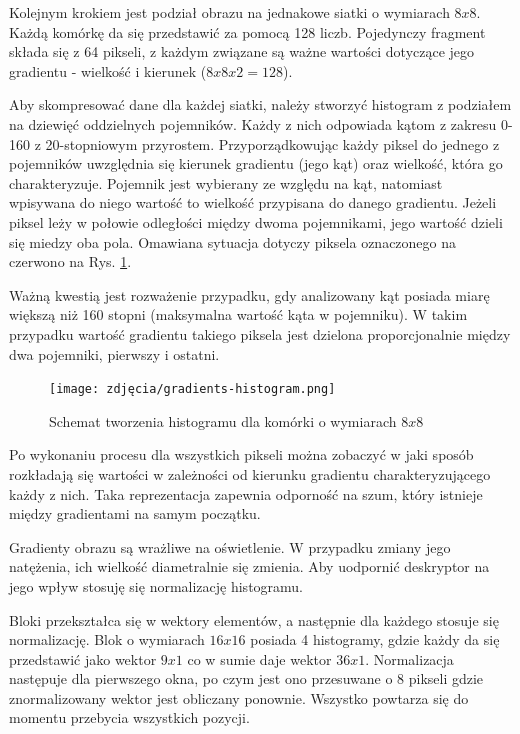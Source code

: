 Kolejnym krokiem jest podział obrazu na jednakowe siatki o wymiarach $8x8$. Każdą komórkę da się przedstawić za pomocą 128 liczb. Pojedynczy fragment składa się z 64 pikseli, z każdym związane są ważne wartości dotyczące jego gradientu - wielkość i kierunek ($8x8x2 = 128$). 

Aby skompresować dane dla każdej siatki, należy stworzyć histogram z podziałem na dziewięć oddzielnych pojemników. Każdy z nich odpowiada kątom z zakresu 0-160 z 20-stopniowym przyrostem. Przyporządkowując każdy piksel do jednego z pojemników uwzględnia się kierunek gradientu (jego kąt) oraz wielkość, która go charakteryzuje. Pojemnik jest wybierany ze względu na kąt, natomiast wpisywana do niego wartość to wielkość przypisana do danego gradientu. Jeżeli piksel leży w połowie odległości między dwoma pojemnikami, jego wartość dzieli się miedzy oba pola. Omawiana sytuacja dotyczy piksela oznaczonego na czerwono na Rys. \ref{fig:gradientHistogram}. 

Ważną kwestią jest rozważenie przypadku, gdy analizowany kąt posiada miarę większą niż 160 stopni (maksymalna wartość kąta w pojemniku). W takim przypadku wartość gradientu takiego piksela jest dzielona proporcjonalnie między dwa pojemniki, pierwszy i ostatni.

\begin{figure}[h]
	\centering
	\texttt{[image: zdjęcia/gradients-histogram.png]}
	\caption{Schemat tworzenia histogramu dla komórki o wymiarach $8x8$ \cite{hog2}} 
	\label{fig:gradientHistogram}
\end{figure}

Po wykonaniu procesu dla wszystkich pikseli można zobaczyć w jaki sposób rozkładają się wartości w zależności od kierunku gradientu charakteryzującego każdy z nich. Taka reprezentacja zapewnia odporność na szum, który istnieje między gradientami na samym początku. 

Gradienty obrazu są wrażliwe na oświetlenie. W przypadku zmiany jego natężenia, ich wielkość diametralnie się zmienia. Aby uodpornić deskryptor na jego wpływ stosuję się normalizację histogramu. 

Bloki przekształca się w wektory elementów, a następnie dla każdego stosuje się normalizację. Blok o wymiarach $16x16$ posiada 4 histogramy, gdzie każdy da się przedstawić jako wektor $9x1$ co w sumie daje wektor $36x1$. Normalizacja następuje dla pierwszego okna, po czym jest ono przesuwane o 8 pikseli gdzie znormalizowany wektor jest obliczany ponownie. Wszystko powtarza się do momentu przebycia wszystkich pozycji.


